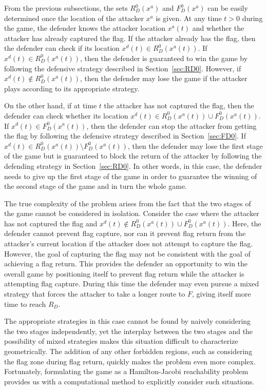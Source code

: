\documentclass[letterpaper, 10 pt, conference]{ieeeconf}  %
\numberwithin{algorithm}{section}
\begin{document}
From the previous subsections, the sets $R_D^0(x^a)$ and $F_D^0(x^a)$ can be easily determined once the location of the attacker $x^a$ is given.  At any time $t>0$ during the game, the defender knows the attacker location $x^a(t)$ and whether the attacker has already captured the flag. If the attacker already has the flag, then the defender can check if its location $x^d(t)\in R_D^0(x^a(t))$. If $x^d(t)\in R_D^0(x^a(t))$, then the defender is guaranteed to win the game by following the defensive strategy described in Section~\ref{sec:RD0}. However, if $x^d(t)\notin R_D^0(x^a(t))$, then the defender may lose the game if the attacker plays according to its appropriate strategy. 

On the other hand, if at time $t$ the attacker has not captured the flag, then the defender can check whether its location $x^d(t)\in R_D^0(x^a(t))\cup F_D^0(x^a(t))$. If $x^d(t)\in F_D^0(x^a(t))$, then the defender can stop the attacker from getting the flag by following the defensive strategy described in Section~\ref{sec:FD0}. If $x^d(t)\in R_D^0(x^a(t))\setminus F_D^0(x^a(t))$, then the defender may lose the first stage of the game but is guaranteed to block the return of the attacker by following the defending strategy in Section~\ref{sec:RD0}. In other words, in this case, the defender needs to give up the first stage of the game in order to guarantee the winning of the second stage of the game and in turn the whole game. 

The true complexity of the problem arises from the fact that the two stages of the game cannot be considered in isolation.  Consider the case where the attacker has not captured the flag and $x^d(t)\notin R_D^0(x^a(t))\cup F_D^0(x^a(t))$. Here, the defender cannot prevent flag capture, nor can it prevent flag return from the attacker's current location if the attacker does not attempt to capture the flag. However, the goal of capturing the flag may not be consistent with the goal of achieving a flag return.  This provides the defender an opportunity to win the overall game by positioning itself to prevent flag return while the attacker is attempting flag capture.  During this time the defender may even pursue a mixed strategy that forces the attacker to take a longer route to $F$, giving itself more time to reach $R_D$.  

The appropriate strategies in this case cannot be found by naively considering the two stages independently, yet the interplay between the two stages and the possibility of mixed strategies makes this situation difficult to characterize geometrically.  The addition of any other forbidden regions, such as considering the flag zone during flag return, quickly makes the problem even more complex.  Fortunately, formulating the game as a Hamilton-Jacobi reachability problem provides us with a computational method to explicitly consider such situations.   
\end{document}
